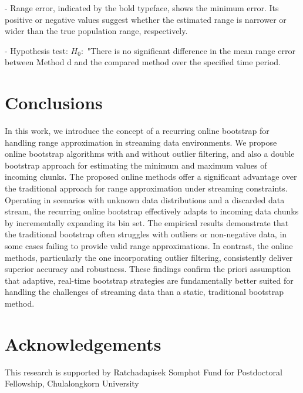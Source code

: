 \documentclass[a4paper,fleqn]{cas-dc}
\begin{document}
\begin{table}[h!]
\begin{threeparttable}
\begin{tablenotes}
          \item - Range error, indicated by the bold typeface, shows the minimum error. Its positive or negative values suggest whether the estimated range is narrower or wider than the true population range, respectively. 
         \item - Hypothesis test: $H_0:$ "There is no significant difference in the mean range error between Method d and 
         the compared method over the specified time period.
    \end{tablenotes}
\end{threeparttable}
\end{table}


\section{Conclusions}
In this work, we introduce the concept of a recurring online bootstrap for handling 
range approximation in streaming data environments. We propose online bootstrap algorithms with and 
without outlier filtering, and also a double bootstrap approach for estimating the minimum 
and maximum values of incoming chunks. The proposed online methods offer a significant advantage over the traditional 
approach for range approximation under streaming constraints. Operating in scenarios with 
unknown data distributions and a discarded data stream, the recurring online bootstrap effectively 
adapts to incoming data chunks by incrementally expanding its bin set. The empirical results demonstrate 
that the traditional bootstrap often struggles with outliers or non-negative data, in some cases 
failing to provide valid range approximations. In contrast, the online methods, particularly the one incorporating 
outlier filtering, consistently deliver superior accuracy and robustness. These findings confirm the priori 
assumption that adaptive, real-time bootstrap strategies are fundamentally better suited for handling the challenges 
of streaming data than a static, traditional bootstrap method.

\section{Acknowledgements}
This research is supported by Ratchadapisek Somphot Fund
for Postdoctoral Fellowship, Chulalongkorn University
\end{document}
